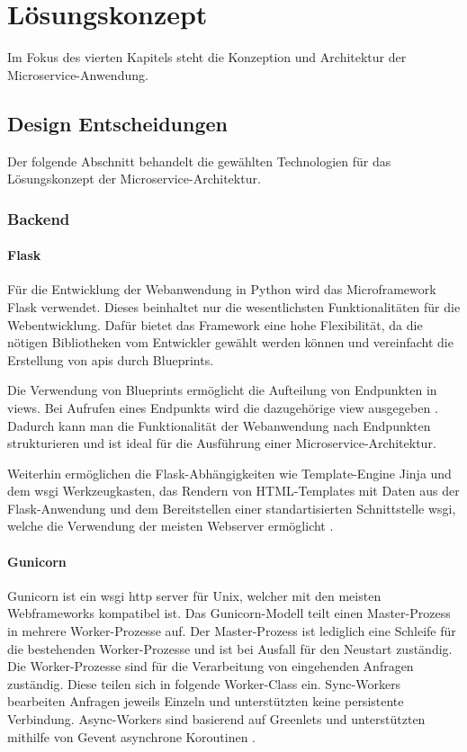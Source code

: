 \chapter{Lösungskonzept}
Im Fokus des vierten Kapitels steht die Konzeption und Architektur der Microservice-Anwendung.

\section{Design Entscheidungen}

Der folgende Abschnitt behandelt die gewählten Technologien für das Lösungskonzept der Microservice-Architektur.

\subsection{Backend}

\subsubsection{Flask}
Für die Entwicklung der Webanwendung in Python wird das Microframework Flask verwendet.
Dieses beinhaltet nur die wesentlichsten Funktionalitäten für die Webentwicklung.
Dafür bietet das Framework eine hohe Flexibilität, da die nötigen Bibliotheken vom Entwickler gewählt werden können \cite{flaskdocu} und
vereinfacht die Erstellung von \acs{api}s \cite[S.11]{restfulpython} durch Blueprints.

Die Verwendung von Blueprints ermöglicht die Aufteilung von Endpunkten in views.
Bei Aufrufen eines Endpunkts wird die dazugehörige view ausgegeben \cite{flaskdocu}.
Dadurch kann man die Funktionalität der Webanwendung nach Endpunkten strukturieren und ist ideal für die Ausführung einer Microservice-Architektur.

Weiterhin ermöglichen die Flask-Abhängigkeiten wie Template-Engine Jinja und dem \acs{wsgi} Werkzeugkasten,
das Rendern von HTML-Templates mit Daten aus der Flask-Anwendung
und dem Bereitstellen einer standartisierten Schnittstelle \ac{wsgi}, welche die Verwendung der meisten Webserver ermöglicht \cite{flaskdocu}.


\subsubsection{Gunicorn}
Gunicorn ist ein \acs{wsgi} \acs{http} server für Unix, welcher mit den meisten Webframeworks kompatibel ist.
Das Gunicorn-Modell teilt einen Master-Prozess in mehrere Worker-Prozesse auf.
Der Master-Prozess ist lediglich eine Schleife für die bestehenden Worker-Prozesse
und ist bei Ausfall für den Neustart zuständig.
Die Worker-Prozesse sind für die Verarbeitung von eingehenden Anfragen zuständig.
Diese teilen sich in folgende Worker-Class ein. 
Sync-Workers bearbeiten Anfragen jeweils Einzeln und unterstützten keine persistente Verbindung.
Async-Workers sind basierend auf Greenlets und unterstützten mithilfe von Gevent asynchrone Koroutinen \cite{gunciorndocs}. 


